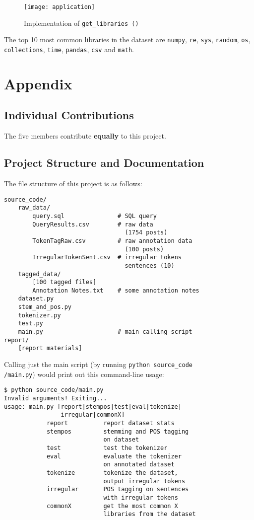 \begin{figure}[htp]
\texttt{[image: application]}
\caption{Implementation of \texttt{get\_libraries\,()}}\label{img:app}
\end{figure}

The top 10 most common libraries in the dataset are \texttt{numpy}, \texttt{re},
\texttt{sys}, \texttt{random}, \texttt{os}, \texttt{collections}, \texttt{time},
\texttt{pandas}, \texttt{csv} and \texttt{math}.

\section*{Appendix}

\subsection*{Individual Contributions}

The five members contribute \textbf{equally} to this project.

\subsection*{Project Structure and Documentation}

The file structure of this project is as follows:

\begin{lstlisting}
source_code/
    raw_data/
        query.sql               # SQL query
        QueryResults.csv        # raw data
                                  (1754 posts)
        TokenTagRaw.csv         # raw annotation data
                                  (100 posts)
        IrregularTokenSent.csv  # irregular tokens
                                  sentences (10)
    tagged_data/
        [100 tagged files]
        Annotation Notes.txt    # some annotation notes
    dataset.py
    stem_and_pos.py
    tokenizer.py
    test.py
    main.py                     # main calling script
report/
    [report materials]
\end{lstlisting}

Calling just the main script (by running \texttt{python source\_code\\/main.py})
would print out this command-line usage:

\begin{lstlisting}
$ python source_code/main.py
Invalid arguments! Exiting...
usage: main.py [report|stempos|test|eval|tokenize|
                irregular|commonX]
            report          report dataset stats
            stempos         stemming and POS tagging
                            on dataset
            test            test the tokenizer
            eval            evaluate the tokenizer
                            on annotated dataset
            tokenize        tokenize the dataset,
                            output irregular tokens
            irregular       POS tagging on sentences
                            with irregular tokens
            commonX         get the most common X
                            libraries from the dataset
\end{lstlisting}

